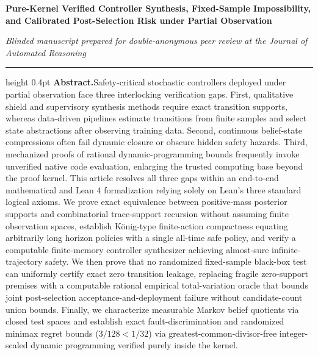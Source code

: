 \documentclass[11pt,a4paper]{article}
\begin{document}
\thispagestyle{plain}
\nolinenumbers
\begin{flushleft}
{\fontsize{17.5}{22}\selectfont\bfseries Pure-Kernel Verified Controller
Synthesis, Fixed-Sample Impossibility, and Calibrated Post-Selection
Risk under Partial Observation\par}
\vspace{8pt}
{\small\emph{Blinded manuscript prepared for double-anonymous peer review at the Journal of Automated Reasoning}\par}
\end{flushleft}
\vspace{6pt}
\hrule height 0.4pt
\vspace{8pt}
\linenumbers
\noindent\textbf{Abstract.}\quad Safety-critical stochastic controllers
deployed under partial observation face three interlocking verification
gaps. First, qualitative shield and supervisory synthesis methods
require exact transition supports, whereas data-driven pipelines
estimate transitions from finite samples and select state abstractions
after observing training data. Second, continuous belief-state
compressions often fail dynamic closure or obscure hidden safety
hazards. Third, mechanized proofs of rational dynamic-programming bounds
frequently invoke unverified native code evaluation, enlarging the
trusted computing base beyond the proof kernel. This article resolves
all three gaps within an end-to-end mathematical and Lean 4
formalization relying solely on Lean's three standard logical axioms. We
prove exact equivalence between positive-mass posterior supports and
combinatorial trace-support recursion without assuming finite
observation spaces, establish König-type finite-action compactness
equating arbitrarily long horizon policies with a single all-time safe
policy, and verify a computable finite-memory controller synthesizer
achieving almost-sure infinite-trajectory safety. We then prove that no
randomized fixed-sample black-box test can uniformly certify exact zero
transition leakage, replacing fragile zero-support premises with a
computable rational empirical total-variation oracle that bounds joint
post-selection acceptance-and-deployment failure without candidate-count
union bounds. Finally, we characterize measurable Markov belief
quotients via closed test spaces and establish exact
fault-discrimination and randomized minimax regret bounds
(\(3/128 < 1/32\)) via greatest-common-divisor-free integer-scaled
dynamic programming verified purely inside the kernel.\par
\vspace{6pt}
\end{document}
